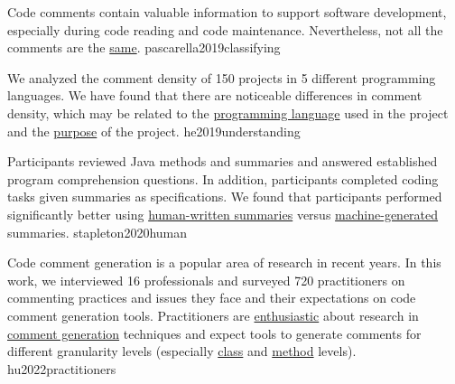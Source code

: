 \documentclass{article}
\begin{document}
  {Code comments contain valuable information to support software development, especially during code reading and code maintenance. Nevertheless, not all the comments are the \ul{same}.}
  {pascarella2019classifying}


  {We analyzed the comment density of 150 projects in 5 different programming languages. We have found that there are noticeable differences in comment density, which may be related to the \ul{programming language} used in the project and the \ul{purpose} of the project.}
  {he2019understanding}


  {Participants reviewed Java methods and summaries and answered established program comprehension questions. In addition, participants completed coding tasks given summaries as specifications. We found that participants performed significantly better using \ul{human-written summaries} versus \ul{machine-generated} summaries.}
  {stapleton2020human}

  {Code comment generation is a popular area of research in recent years. In this work, we interviewed 16 professionals and surveyed 720 practitioners on commenting practices and issues they face and their expectations on code comment generation tools. Practitioners are \ul{enthusiastic} about research in \ul{comment generation} techniques and expect tools to generate comments for different granularity levels (especially \ul{class} and \ul{method} levels).}
  {hu2022practitioners}
\end{document}
